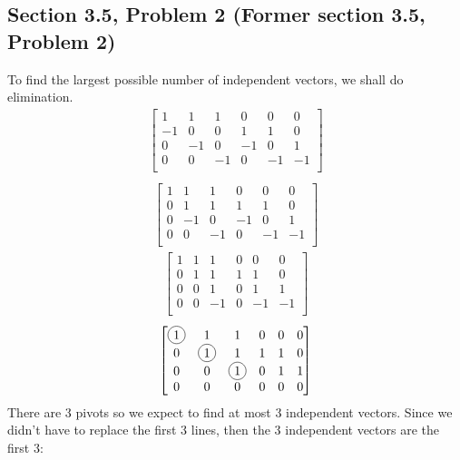 \documentclass[a4paper,11pt]{article}
\newcommand*\circled[1]{\tikz[baseline=(char.base)]{
             \node[shape=circle,draw,inner sep=2pt] (char) {#1};}}
\begin{document}
\subsection*{Section 3.5, Problem 2  (Former section 3.5, Problem 2)}
To find the largest possible number of independent vectors, we shall do elimination.
\begin{align*}
\begin{bmatrix}
1  & 1  & 1  & 0  & 0  & 0 \\
-1 & 0  & 0  & 1  & 1  & 0 \\
0  & -1 & 0  & -1 & 0  & 1 \\
0  & 0  & -1 & 0  & -1 & -1 \\
\end{bmatrix}\\
\end{align*}
\begin{align*}
\begin{bmatrix}
1  & 1  & 1  & 0  & 0  & 0 \\
0  & 1  & 1  & 1  & 1  & 0 \\
0  & -1 & 0  & -1 & 0  & 1 \\
0  & 0  & -1 & 0  & -1 & -1 \\
\end{bmatrix}
\end{align*}
\begin{align*}
\begin{bmatrix}
1  & 1  & 1  & 0  & 0  & 0 \\
0  & 1  & 1  & 1  & 1  & 0 \\
0  & 0  & 1  & 0  & 1  & 1 \\
0  & 0  & -1 & 0  & -1 & -1 \\
\end{bmatrix}
\end{align*}
\begin{align*}
\begin{bmatrix}
\circled{1} & 1  			& 1  			& 0  & 0  & 0 \\
0  			& \circled{1}  	& 1  			& 1  & 1  & 0 \\
0  			& 0  			& \circled{1}  	& 0  & 1  & 1 \\
0  			& 0  			& 0  			& 0  & 0  & 0 \\
\end{bmatrix}
\end{align*}
There are 3 pivots so we expect to find at most 3 independent vectors. Since we didn't have to replace the first 3 lines, then the 3 independent vectors are the first 3:
\end{document}
